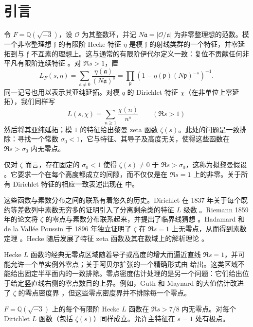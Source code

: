 \section{引言}\label{sec:introduction}

令 $F=\mathbb Q(\sqrt{-3})$，设 $\mathcal O$ 为其整数环，并记 $N\mathfrak a=|\mathcal O/\mathfrak a|$ 为非零整理想的范数。模一个非零整理想 $\mathfrak f$ 的有限阶 Hecke 特征 $\eta$ 是模 $\mathfrak f$ 的射线类群的一个特征，并零延拓到与 $\mathfrak f$ 不互素的理想上。这与通常的有限阶伊代尔定义一致：复位不贡献任何非平凡有限阶连续特征 \cite[第 VI 章，第 1 节]{MilneCFT}。对 $\Re s>1$，置
\[
 L_F(s,\eta)=\sum_{\mathfrak a\ne0}
       \frac{\eta(\mathfrak a)}{(N\mathfrak a)^s}
 =\prod_{\mathfrak p}
       \left(1-\eta(\mathfrak p)(N\mathfrak p)^{-s}\right)^{-1}.
\]
同一记号也用以表示其亚纯延拓。对模 $q$ 的 Dirichlet 特征 $\chi$（在非单位上零延拓），我们同样写
\[
 L(s,\chi)=\sum_{n\ge1}\frac{\chi(n)}{n^s}
 \qquad(\Re s>1)
\]
然后将其亚纯延拓；模 $1$ 的特征给出黎曼 zeta 函数 $\zeta(s)$。此处的问题是一致排除：寻找一个常数 $\sigma_0<1$，它与特征、其导子及高度无关，使得这些函数在 $\Re s>\sigma_0$ 内无零点。

仅对 $\zeta$ 而言，存在固定的 $\sigma_0<1$ 使得 $\zeta(s)\ne0$ 于 $\Re s>\sigma_0$，这称为拟黎曼假设 \cite[第 1 节]{BCSS}。它要求一个在每个高度都成立的间隙，而不仅仅是在 $\Re s=1$ 上的非零。关于所有 Dirichlet 特征的相应一致表述出现在 \cite[第 288 页，方程 (1.4) 及其后一段]{FG} 中。

这些函数与素数分布之间的联系有着悠久的历史。Dirichlet 在 1837 年关于每个既约等差数列中素数无穷多的证明引入了分离剩余类的特征 $L$ 级数 \cite{Dirichlet}。Riemann 1859 年的论文将 $\zeta$ 的零点与素数分布联系起来，并提出了临界线猜想 \cite{Riemann}。Hadamard 和 de la Vall\'ee Poussin 于 1896 年独立证明了 $\zeta$ 在 $\Re s=1$ 上无零点，从而得到素数定理 \cite{Hadamard,ValleePoussin}。Hecke 随后发展了特征 zeta 函数及其在数域上的解析理论 \cite{Hecke}。

Hecke $L$ 函数的经典无零点区域随着导子或高度的增大而逼近直线 $\Re s=1$，并可能允许一个单实例外零点；关于阿贝尔扩张的一个精确形式由 \cite[定理 3.1]{TZ} 给出。这类区域不能给出固定半平面内的一致排除。零点密度估计处理的是另一个问题：它们给出位于给定竖直线右侧的零点数目的上界。例如，Guth 和 Maynard 的大值估计改进了 $\zeta$ 的零点密度界 \cite[定理 1.2]{GM}，但这些零点密度界并不排除每一个零点。

\begin{theorem}\label{thm:main}
$F=\mathbb Q(\sqrt{-3})$ 上的每个有限阶 Hecke $L$ 函数在 $\Re s>7/8$ 内无零点。对每个 Dirichlet $L$ 函数（包括 $\zeta(s)$）同样成立。允许主特征在 $s=1$ 处有极点。
\end{theorem}

